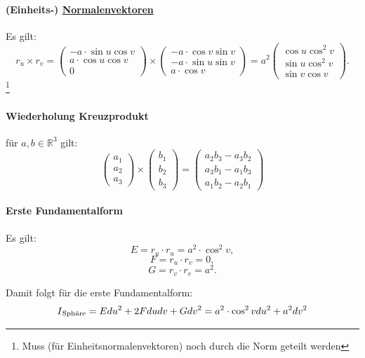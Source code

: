 \documentclass[a4paper,11pt,notitlepage]{report}
\theoremstyle{definition}
\newcommand{\R}{{\ensuremath{\mathbb{R}}}}
\newcommand{\RM}[1]{\MakeUppercase{\romannumeral #1{}}}
\begin{document}
\paragraph{(Einheits-) \underline{Normalenvektoren}}
Es gilt:
$$r_u \times r_v = \begin{pmatrix}
- a \cdot \sin u \cos v \\ a \cdot \cos u \cos v \\ 0
\end{pmatrix} \times \begin{pmatrix}
- a \cdot \cos v \sin v \\ -a \cdot \sin u \sin v \\ a \cdot \cos v
\end{pmatrix} = a^2 \begin{pmatrix}
\cos u \cos^2 v \\ \sin u \cos^2 v \\ \sin v \cos v
\end{pmatrix}.$$ \footnote{Muss (für Einheitsnormalenvektoren) noch durch die Norm geteilt werden}
\newline
\hrulefill
\newline \paragraph{Wiederholung Kreuzprodukt}
für $a,b \in \R^3$ gilt:
$$\begin{pmatrix}
a_1 \\ a_2 \\ a_3
\end{pmatrix} \times \begin{pmatrix}
b_1 \\ b_2 \\ b_3
\end{pmatrix} = \begin{pmatrix}
a_2b_3 - a_3b_2 \\ a_3b_1 - a_1 b_3 \\ a_1 b_2 - a_2 b_1
\end{pmatrix}$$

\paragraph{Erste Fundamentalform}
Es gilt:
$$E = r_u \cdot r_u = a^2 \cdot \cos^2 v,$$
$$F = r_u \cdot r_v = 0,$$
$$G = r_v \cdot r_v = a^2.$$

Damit folgt für die erste Fundamentalform:
$$\RM{1}_\text{Sphäre} = E du^2 + 2 F du dv + G dv^2 = a^2 \cdot \cos^2 v du^2 + a^2 dv^2$$
\end{document}
